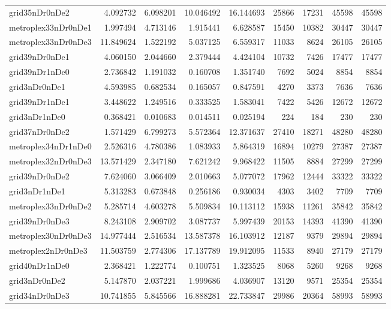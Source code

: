 \begin{longtable}{|l|r|r|r|r|r|r|r|r|}
grid35nDr0nDe2 & 4.092732 & 6.098201 & 10.046492 & 16.144693 & 25866 & 17231 & 45598 & 45598 \\
metroplex33nDr0nDe1 & 1.997494 & 4.713146 & 1.915441 & 6.628587 & 15450 & 10382 & 30447 & 30447 \\
metroplex33nDr0nDe3 & 11.849624 & 1.522192 & 5.037125 & 6.559317 & 11033 & 8624 & 26105 & 26105 \\
grid39nDr0nDe1 & 4.060150 & 2.044660 & 2.379444 & 4.424104 & 10732 & 7426 & 17477 & 17477 \\
grid39nDr1nDe0 & 2.736842 & 1.191032 & 0.160708 & 1.351740 & 7692 & 5024 & 8854 & 8854 \\
grid3nDr0nDe1 & 4.593985 & 0.682534 & 0.165057 & 0.847591 & 4270 & 3373 & 7636 & 7636 \\
grid39nDr1nDe1 & 3.448622 & 1.249516 & 0.333525 & 1.583041 & 7422 & 5426 & 12672 & 12672 \\
grid3nDr1nDe0 & 0.368421 & 0.010683 & 0.014511 & 0.025194 & 224 & 184 & 230 & 230 \\
grid37nDr0nDe2 & 1.571429 & 6.799273 & 5.572364 & 12.371637 & 27410 & 18271 & 48280 & 48280 \\
metroplex34nDr1nDe0 & 2.526316 & 4.780386 & 1.083933 & 5.864319 & 16894 & 10279 & 27387 & 27387 \\
metroplex32nDr0nDe3 & 13.571429 & 2.347180 & 7.621242 & 9.968422 & 11505 & 8884 & 27299 & 27299 \\
grid39nDr0nDe2 & 7.624060 & 3.066409 & 2.010663 & 5.077072 & 17962 & 12444 & 33322 & 33322 \\
grid3nDr1nDe1 & 5.313283 & 0.673848 & 0.256186 & 0.930034 & 4303 & 3402 & 7709 & 7709 \\
metroplex33nDr0nDe2 & 5.285714 & 4.603278 & 5.509834 & 10.113112 & 15938 & 11261 & 35842 & 35842 \\
grid39nDr0nDe3 & 8.243108 & 2.909702 & 3.087737 & 5.997439 & 20153 & 14393 & 41390 & 41390 \\
metroplex30nDr0nDe3 & 14.977444 & 2.516534 & 13.587378 & 16.103912 & 12187 & 9379 & 29894 & 29894 \\
metroplex2nDr0nDe3 & 11.503759 & 2.774306 & 17.137789 & 19.912095 & 11533 & 8940 & 27179 & 27179 \\
grid40nDr1nDe0 & 2.368421 & 1.222774 & 0.100751 & 1.323525 & 8068 & 5260 & 9268 & 9268 \\
grid3nDr0nDe2 & 5.147870 & 2.037221 & 1.999686 & 4.036907 & 13120 & 9571 & 25354 & 25354 \\
grid34nDr0nDe3 & 10.741855 & 5.845566 & 16.888281 & 22.733847 & 29986 & 20364 & 58993 & 58993 \\

\end{longtable}
